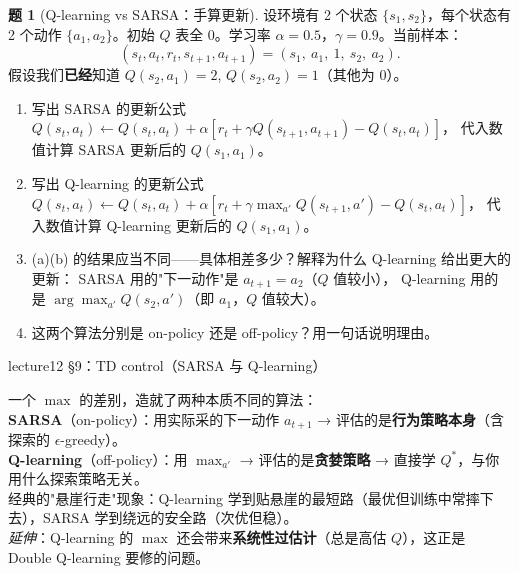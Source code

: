 \documentclass[11pt,a4paper]{article}
\theoremstyle{definition}
\newtheorem{problem}{题}
\begin{document}
\medskip

\begin{problem}[Q-learning vs SARSA：手算更新]
设环境有 2 个状态 $\{s_1, s_2\}$，每个状态有 2 个动作 $\{a_1, a_2\}$。初始 $Q$ 表全 0。学习率 $\alpha = 0.5$，$\gamma = 0.9$。当前样本：
\[
(s_t, a_t, r_t, s_{t+1}, a_{t+1}) = (s_1,\ a_1,\ 1,\ s_2,\ a_2).
\]
假设我们\textbf{已经}知道 $Q(s_2, a_1) = 2$, $Q(s_2, a_2) = 1$（其他为 0）。

\begin{enumerate}[label=(\alph*)]
    \item 写出 SARSA 的更新公式
    $Q(s_t, a_t) \leftarrow Q(s_t, a_t) + \alpha [r_t + \gamma Q(s_{t+1}, a_{t+1}) - Q(s_t, a_t)]$，
    代入数值计算 SARSA 更新后的 $Q(s_1, a_1)$。
    \item 写出 Q-learning 的更新公式
    $Q(s_t, a_t) \leftarrow Q(s_t, a_t) + \alpha [r_t + \gamma \max_{a'} Q(s_{t+1}, a') - Q(s_t, a_t)]$，
    代入数值计算 Q-learning 更新后的 $Q(s_1, a_1)$。
    \item (a)(b) 的结果应当不同——具体相差多少？解释为什么 Q-learning 给出更大的更新：
    SARSA 用的"下一动作"是 $a_{t+1} = a_2$（$Q$ 值较小），
    Q-learning 用的是 $\arg\max_{a'} Q(s_2, a')$（即 $a_1$，$Q$ 值较大）。
    \item 这两个算法分别是 on-policy 还是 off-policy？用一句话说明理由。
\end{enumerate}
\begin{topicbox}
lecture12 §9：TD control（SARSA 与 Q-learning）
\end{topicbox}
\begin{takeaway}
一个 $\max$ 的差别，造就了两种本质不同的算法：\\
\textbf{SARSA}（on-policy）：用实际采的下一动作 $a_{t+1}$ → 评估的是\textbf{行为策略本身}（含探索的 $\epsilon$-greedy）。\\
\textbf{Q-learning}（off-policy）：用 $\max_{a'}$ → 评估的是\textbf{贪婪策略} → 直接学 $Q^*$，与你用什么探索策略无关。\\
经典的"悬崖行走"现象：Q-learning 学到贴悬崖的最短路（最优但训练中常摔下去），SARSA 学到绕远的安全路（次优但稳）。\\
\textit{延伸}：Q-learning 的 $\max$ 还会带来\textbf{系统性过估计}（总是高估 $Q$），这正是 Double Q-learning 要修的问题。
\end{takeaway}
\end{problem}

\medskip
\end{document}
